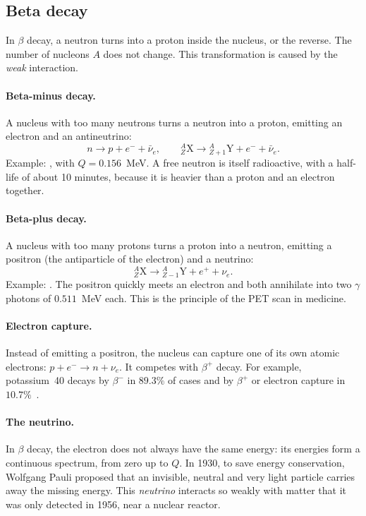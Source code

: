 \documentclass[11pt,a4paper]{article}
\newcommand{\nuc}[3]{\ensuremath{{}^{#1}_{#2}\mathrm{#3}}}   %
\begin{document}
\subsection{Beta decay}
\label{sec:beta}

In $\beta$ decay, a neutron turns into a proton inside the nucleus, or the reverse. The number of nucleons $A$ does not change. This transformation is caused by the \emph{weak} interaction.

\paragraph{Beta-minus decay.} A nucleus with too many neutrons turns a neutron into a proton, emitting an electron and an antineutrino:
\[
n \longrightarrow p + e^- + \bar{\nu}_e ,
\qquad
\nuc{A}{Z}{X} \longrightarrow \nuc{A}{Z+1}{Y} + e^- + \bar{\nu}_e .
\]
Example: , with $Q = 0.156$~MeV. A free neutron is itself radioactive, with a half-life of about 10 minutes, because it is heavier than a proton and an electron together.

\paragraph{Beta-plus decay.} A nucleus with too many protons turns a proton into a neutron, emitting a positron (the antiparticle of the electron) and a neutrino:
\[
\nuc{A}{Z}{X} \longrightarrow \nuc{A}{Z-1}{Y} + e^+ + \nu_e .
\]
Example: . The positron quickly meets an electron and both annihilate into two $\gamma$ photons of $0.511$~MeV each. This is the principle of the PET scan in medicine.

\paragraph{Electron capture.} Instead of emitting a positron, the nucleus can capture one of its own atomic electrons: $p + e^- \to n + \nu_e$. It competes with $\beta^+$ decay. For example, potassium~40 decays by $\beta^-$ in $89.3\%$ of cases and by $\beta^+$ or electron capture in $10.7\%$~\cite{NUBASE2020}.

\paragraph{The neutrino.} In $\beta$ decay, the electron does not always have the same energy: its energies form a continuous spectrum, from zero up to $Q$. In 1930, to save energy conservation, Wolfgang Pauli proposed that an invisible, neutral and very light particle carries away the missing energy. This \emph{neutrino} interacts so weakly with matter that it was only detected in 1956, near a nuclear reactor.
\end{document}
